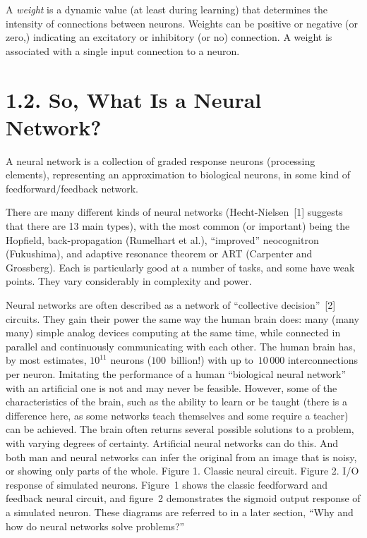 \documentclass[12pt]{report}
\begin{document}
A {\sl weight\/} is a dynamic value (at least during learning) that
determines the intensity of connections between neurons.
Weights can be positive or negative (or zero,) indicating an excitatory or
inhibitory (or no) connection.
A weight is associated with a single input connection to a neuron.

\section{1.2. So, What Is a Neural Network?}

A neural network is a collection of graded response neurons (processing elements),
representing an approximation to biological neurons, in some kind of
feedforward/feedback network.

There are many different kinds of neural networks (Hecht-Nielsen~[1] suggests 
that there are 13
main types), with the most common (or important) being the Hopfield,
back-propagation (Rumelhart et al.), ``improved'' neocognitron (Fukushima), and
adaptive resonance theorem or ART (Carpenter and Grossberg).
Each is particularly good at a number of tasks, and some have weak
points.
They vary considerably in complexity and power.

Neural networks are often described as a network of ``collective decision''~[2]
circuits.
They gain their power the same way the human brain does: many (many
many) simple analog devices computing at the same time, while connected
in parallel and continuously communicating with each other.
The human brain has, by most estimates, $10^{11}$ neurons %
($100$~billion!) with up to~$10\,000$ interconnections per neuron.
Imitating the performance of a human ``biological neural network'' with an
artificial one is not and may never be feasible.
However, some of the characteristics of the brain, such as the ability
to learn or be taught (there is a difference here, as some networks
teach themselves and some require a teacher) can be achieved.
The brain often returns several possible solutions to a problem, with
varying degrees of certainty.
Artificial neural networks can do this.
And both man and neural networks can infer the original from an image that is
noisy, or showing only parts of the whole.
\goodbreak%
Figure 1. Classic neural circuit. Figure 2. I/O response of simulated
neurons.
Figure~1 shows the classic feedforward and feedback neural circuit, and
figure~2 demonstrates the sigmoid output response of a simulated neuron.
These diagrams are referred to in a later section, ``Why and how do
neural networks solve problems?''
\end{document}
